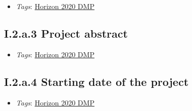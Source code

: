 \documentclass[a4paper,12pt]{report}
\begin{document}
\label{1e85da40-bbfc-4180-903e-6c569ed2da38.c3dabaaf-c946-4a0d-889c-ede966f97667.01fb6972-a748-47d6-9974-6cfa59b4b156.5b765df9-299f-4855-9e99-aa844903f8f6}


\begin{itemize}
  \item \textit{Tags}: \ul{Horizon 2020 DMP}
  \end{itemize}





\subsection*{\protect\textcolor{colorSecId}{I.2.a.3} Project abstract}

\label{1e85da40-bbfc-4180-903e-6c569ed2da38.c3dabaaf-c946-4a0d-889c-ede966f97667.01fb6972-a748-47d6-9974-6cfa59b4b156.22583d74-3c98-4e0a-b363-26d767c88212}


\begin{itemize}
  \item \textit{Tags}: \ul{Horizon 2020 DMP}
  \end{itemize}





\subsection*{\protect\textcolor{colorSecId}{I.2.a.4} Starting date of the project}

\label{1e85da40-bbfc-4180-903e-6c569ed2da38.c3dabaaf-c946-4a0d-889c-ede966f97667.01fb6972-a748-47d6-9974-6cfa59b4b156.de84b9b5-bcd0-4954-8370-72ea83916b8c}


\begin{itemize}
  \item \textit{Tags}: \ul{Horizon 2020 DMP}
  \end{itemize}
\end{document}
